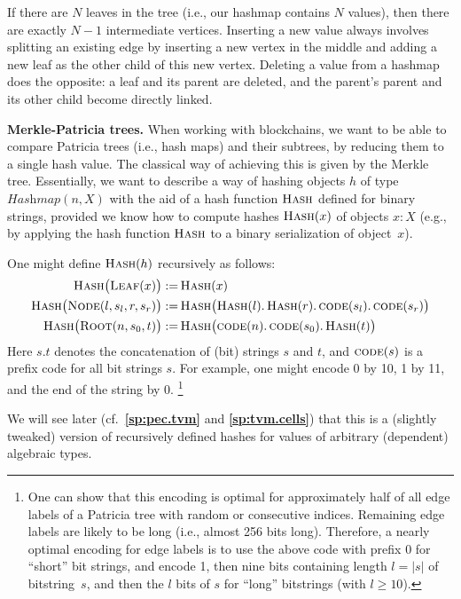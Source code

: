\documentclass[12pt,oneside]{article}
\def\makepoint#1{\medbreak\noindent{\bf #1.\ }}
\def\nxsubpoint{\refstepcounter{subsubsection}%
  \smallbreak\makepoint{\thesubsubsection}}
\def\refpoint#1{{\rm\textbf{\ref{#1}}}}
\let\ptref=\refpoint
\def\embt(#1.){\textbf{#1.}}
\let\tp=\textit
\def\opsc#1{\operatorname{\textsc{#1}}}
\def\Hash{\opsc{Hash}}
\def\leaf{\opsc{Leaf}}
\def\node{\opsc{Node}}
\def\root{\opsc{Root}}
\def\code{\opsc{code}}
\def\Hashmap{\tp{Hashmap}}
\begin{document}
If there are $N$ leaves in the tree (i.e., our hashmap contains $N$
values), then there are exactly $N-1$ intermediate vertices. Inserting
a new value always involves splitting an existing edge by inserting a
new vertex in the middle and adding a new leaf as the other child of
this new vertex. Deleting a value from a hashmap does the opposite: a
leaf and its parent are deleted, and the parent's parent and its other
child become directly linked.

\nxsubpoint\label{sp:merkle.patr.hash} \embt(Merkle-Patricia trees.)
When working with blockchains, we want to be able to compare Patricia
trees (i.e., hash maps) and their subtrees, by reducing them to a
single hash value. The classical way of achieving this is given by the
Merkle tree. Essentially, we want to describe a way of hashing objects
$h$ of type $\Hashmap(n,X)$ with the aid of a hash function $\Hash$
defined for binary strings, provided we know how to compute hashes
$\Hash(x)$ of objects $x:X$ (e.g., by applying the hash function
$\Hash$ to a binary serialization of object~$x$).

One might define $\Hash(h)$ recursively as follows:
\begin{align}\label{eq:hash.leaf}
  \Hash\bigl(\leaf(x)\bigr):=&\Hash(x)\\
  \label{eq:hash.node}
  \Hash\bigl(\node(l,s_l,r,s_r)\bigr):=&\Hash\bigl(\Hash(l).\Hash(r).\code(s_l).\code(s_r)\bigr)\\ \Hash\bigl(\root(n,s_0,t)\bigr):=&\Hash\bigl(\code(n).\code(s_0).\Hash(t)\bigr)
\end{align}
Here $s.t$ denotes the concatenation of (bit) strings $s$ and $t$, and
$\code(s)$ is a prefix code for all bit strings $s$. For example, one
might encode 0 by 10, 1 by 11, and the end of the string by 0.%
\footnote{One can show that this encoding is optimal for approximately
  half of all edge labels of a Patricia tree with random or
  consecutive indices. Remaining edge labels are likely to be long
  (i.e., almost 256 bits long). Therefore, a nearly optimal encoding
  for edge labels is to use the above code with prefix 0 for ``short''
  bit strings, and encode 1, then nine bits containing length $l=|s|$
  of bitstring~$s$, and then the $l$ bits of $s$ for ``long''
  bitstrings (with $l\geq10$).}

We will see later (cf.~\ptref{sp:pec.tvm} and \ptref{sp:tvm.cells})
that this is a (slightly tweaked) version of recursively defined
hashes for values of arbitrary (dependent) algebraic types.
\end{document}
